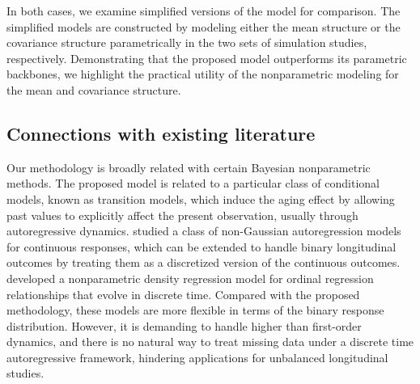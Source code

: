 In both cases, we examine simplified versions of the model for comparison. 
The simplified models are constructed by modeling either the mean structure or 
the covariance structure parametrically in the two sets of simulation studies, 
respectively. Demonstrating that the proposed model outperforms its parametric 
backbones, we highlight the practical utility of the nonparametric modeling 
for the mean and covariance structure.  




\subsection{Connections with existing literature}
\label{subsec:literaturereview}


Our methodology is broadly related with certain Bayesian nonparametric methods. 
The proposed model is related to a particular class of conditional models, known as 
transition models, which induce the aging effect by allowing past values to explicitly 
affect the present observation, usually through autoregressive dynamics. 
\citet{DiLucca2013} studied a class of non-Gaussian autoregression models
for continuous responses, which can be extended to handle binary longitudinal outcomes by 
treating them as a discretized version of the continuous outcomes. 
\citet{MariaJASA2018} developed a nonparametric density regression model for ordinal 
regression relationships that evolve in discrete time. 
Compared with the proposed methodology, these models are more flexible in terms of the 
binary response distribution. However, it is demanding to handle higher than first-order
dynamics, and there is no natural way to treat missing data under a discrete time 
autoregressive framework, hindering applications for unbalanced longitudinal studies.


